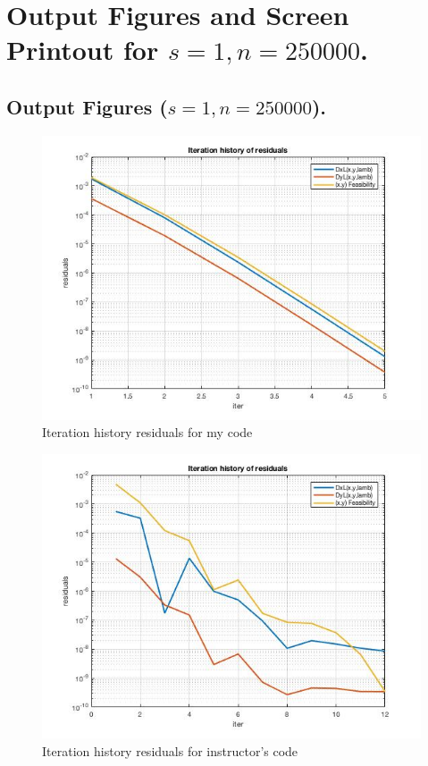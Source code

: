 \clearpage
\section{Output Figures and Screen Printout for $s=1,n=250000$.}
\subsection{Output Figures ($s=1,n=250000$).}
\begin{figure}[H]
\centering
\includegraphics[width=12cm]{F_11/F_1_2.jpg}
\caption{Iteration history residuals for my code}
\end{figure}
\begin{figure}[H]
\centering
\includegraphics[width=12cm]{F_11/F_1_3.jpg}
\caption{Iteration history residuals for instructor's code}
\end{figure}


